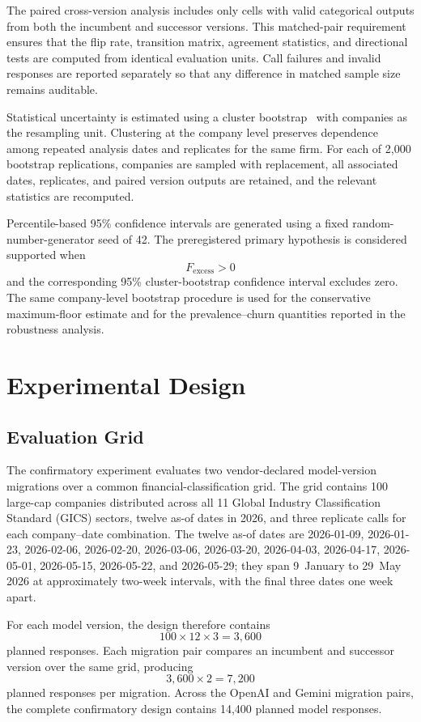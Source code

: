 \documentclass[11pt]{article}
\begin{document}
The paired cross-version analysis includes only cells with valid categorical outputs from both the incumbent and successor versions. This matched-pair requirement ensures that the flip rate, transition matrix, agreement statistics, and directional tests are computed from identical evaluation units. Call failures and invalid responses are reported separately so that any difference in matched sample size remains auditable.

Statistical uncertainty is estimated using a cluster bootstrap~\cite{efron} with companies as the resampling unit. Clustering at the company level preserves dependence among repeated analysis dates and replicates for the same firm. For each of 2{,}000 bootstrap replications, companies are sampled with replacement, all associated dates, replicates, and paired version outputs are retained, and the relevant statistics are recomputed.

Percentile-based 95\% confidence intervals are generated using a fixed random-number-generator seed of 42. The preregistered primary hypothesis is considered supported when
\begin{equation}
F_{\mathrm{excess}}>0
\end{equation}
and the corresponding 95\% cluster-bootstrap confidence interval excludes zero. The same company-level bootstrap procedure is used for the conservative maximum-floor estimate and for the prevalence--churn quantities reported in the robustness analysis.

\section{Experimental Design}
\subsection{Evaluation Grid}
The confirmatory experiment evaluates two vendor-declared model-version migrations over a common financial-classification grid. The grid contains 100 large-cap companies distributed across all 11 Global Industry Classification Standard (GICS) sectors, twelve as-of dates in 2026, and three replicate calls for each company--date combination. The twelve as-of dates are 2026-01-09, 2026-01-23, 2026-02-06, 2026-02-20, 2026-03-06, 2026-03-20, 2026-04-03, 2026-04-17, 2026-05-01, 2026-05-15, 2026-05-22, and 2026-05-29; they span 9~January to 29~May 2026 at approximately two-week intervals, with the final three dates one week apart.

For each model version, the design therefore contains
\begin{equation}
100 \times 12 \times 3 = 3{,}600
\end{equation}
planned responses. Each migration pair compares an incumbent and successor version over the same grid, producing
\begin{equation}
3{,}600 \times 2 = 7{,}200
\end{equation}
planned responses per migration. Across the OpenAI and Gemini migration pairs, the complete confirmatory design contains 14{,}400 planned model responses.
\end{document}
